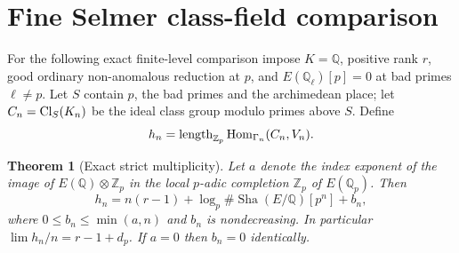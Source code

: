 \documentclass[11pt,a4paper]{article}
\newtheorem{theorem}{Theorem}[section]
\theoremstyle{definition}\newtheorem{definition}[theorem]{Definition}
\theoremstyle{remark}\newtheorem{remark}[theorem]{Remark}
\newcommand{\Sha}{\operatorname{\mathrm{Sha}}}
\newcommand{\ZZ}{\mathbb Z}\newcommand{\QQ}{\mathbb Q}\newcommand{\FF}{\mathbb F}
\numberwithin{equation}{section}
\begin{document}
\section{Fine Selmer class-field comparison}
For the following exact finite-level comparison impose $K=\QQ$, positive rank $r$, good ordinary non-anomalous reduction at $p$, and $E(\QQ_\ell)[p]=0$ at bad primes $\ell\ne p$. Let $S$ contain $p$, the bad primes and the archimedean place; let $C_n=\operatorname{Cl}_S(K_n)$ be the ideal class group modulo primes above $S$. Define
\[
h_n=\length_{\ZZ_p}\Hom_{\Gamma_n}(C_n,V_n).
\]
\begin{theorem}[Exact strict multiplicity]\label{thm:fine}
Let $a$ denote the index exponent of the image of $E(\QQ)\otimes\ZZ_p$ in the local $p$-adic completion $\ZZ_p$ of $E(\QQ_p)$. Then
\begin{equation}\label{eq:hn}
h_n=n(r-1)+\log_p\#\Sha(E/\QQ)[p^n]+b_n,
\end{equation}
where $0\leq b_n\leq\min(a,n)$ and $b_n$ is nondecreasing. In particular $\lim h_n/n=r-1+d_p$. If $a=0$ then $b_n=0$ identically.
\end{theorem}
\end{document}
